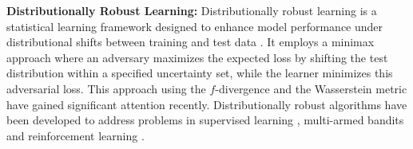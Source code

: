 \textbf{Distributionally Robust Learning: } Distributionally robust learning is a statistical learning framework designed to enhance model performance under distributional shifts between training and test data \cite{chen2018robust}. It employs a minimax approach where an adversary maximizes the expected loss by shifting the test distribution within a specified uncertainty set, while the learner minimizes this adversarial loss. This approach using the $f$-divergence \citep{namkoong2016stochastic,duchi2018learning, levy2020large} and the Wasserstein metric \citep{esfahani2015data,kuhn2019wasserstein,gao2022wasserstein} have gained significant attention recently. Distributionally robust algorithms have been developed to address problems in supervised learning \cite{chen2018robust, namkoong2016stochastic, levy2020large}, multi-armed bandits \cite{si2020distributionally, yang2023distributionally} and reinforcement learning \cite{panaganti-rfqi, zhou2024natural, shi2024distributionally,yang2022toward}.